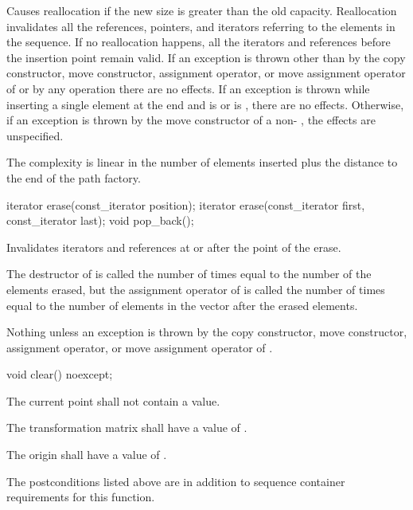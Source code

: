 \begin{itemdescr}
	\pnum
	\remarks
	Causes reallocation if the new size is greater than the old capacity.
	Reallocation invalidates all the references, pointers, and iterators
	referring to the elements in the sequence.
	If no reallocation happens, all the iterators and references before the insertion point remain valid.
	If an exception is thrown other than by
	the copy constructor, move constructor,
	assignment operator, or move assignment operator of
	 or by any  operation
	there are no effects.
	If an exception is thrown while inserting a single element at the end and
	 is  or 
	is , there are no effects.
	Otherwise, if an exception is thrown by the move constructor of a non-
	, the effects are unspecified.
	
	\pnum
	\complexity
	The complexity is linear in the number of elements inserted plus the 
	distance to the end of the path factory.
\end{itemdescr}

\begin{itemdecl}
	iterator erase(const_iterator position);
	iterator erase(const_iterator first, const_iterator last);
	void pop_back();
\end{itemdecl}

\begin{itemdescr}
	\pnum
	\effects
	Invalidates iterators and references at or after the point of the erase.
	
	\pnum
	\complexity
	The destructor of  is called the number of times equal to 
	the number of the elements erased, but the assignment operator
	of  is called the number of times equal to the number of
	elements in the vector after the erased elements.
	
	\pnum
	\throws
	Nothing unless an exception is thrown by the copy constructor, move 
	constructor, assignment operator, or move assignment operator of
	.
\end{itemdescr}

\begin{itemdecl}
	void clear() noexcept;
\end{itemdecl}
\begin{itemdescr}
	\pnum
	\postconditions
	\pnum
	The current point shall not contain a value.
	
	\pnum
	The transformation matrix shall have a value of .
	
	\pnum
	The origin shall have a value of .
	
	\pnum
	\remarks
	The postconditions listed above are in addition to sequence container requirements for this function.
\end{itemdescr}

